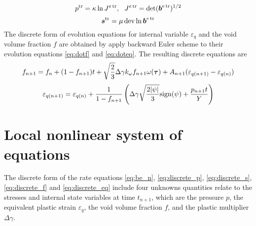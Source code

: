 %
\begin{equation}\label{eq:ptr}
p^{\operatorname{\text{tr}}} = \kappa\ln J^{e\operatorname{\text{tr}}},~~J^{e\operatorname{\text{tr}}} = \det({\boldsymbol{b}}^{e\operatorname{\text{tr}}})^{1/2}
\end{equation}
%
\begin{equation}\label{eq:str}
{\boldsymbol{s}}^{\operatorname{\text{tr}}} = \mu\operatorname{\text{dev}}\ln{\boldsymbol{b}}^{e\operatorname{\text{tr}}}
\end{equation}
%
The discrete form of evolution equations for internal variable 
$\varepsilon_q$ and the void volume fraction $f$ are obtained by apply 
backward Euler scheme to their evolution equations \eqref{eq:dotf} and 
\eqref{eq:doteq}. The resulting discrete equations are
%
\begin{equation}\label{eq:discrete_f}
f_{n+1} = f_n + (1-f_{n+1})t + \sqrt{\frac{2}{3}}\Delta\gamma
k_{\omega}f_{n+1} \omega({\boldsymbol{\tau}}) + A_{n+1}(\varepsilon_{q(n+1)} - 
\varepsilon_{q(n)})
\end{equation}
%
\begin{equation}\label{eq:discrete_eq}
\varepsilon_{q(n+1)} = \varepsilon_{q(n)} + \frac{1}{1-f_{n+1}}
\left(\Delta\gamma\sqrt{\frac{2|\psi|}{3}} {\rm sign}(\psi) + 
\frac{p_{n+1} t}{Y}\right)
\end{equation}

\section{Local nonlinear system of equations}

The discrete form of the rate equations \eqref{eq:be_n}, 
\eqref{eq:discrete_p}, \eqref{eq:discrete_s}, \eqref{eq:discrete_f} and \eqref{eq:discrete_eq} include four unknowns quantities relate to the stresses and internal state variables at time $t_{n+1}$, which are the pressure $p$, the equivalent plastic strain $\varepsilon_q$, the void volume fraction $f$, and the plastic multiplier $\Delta\gamma$.

